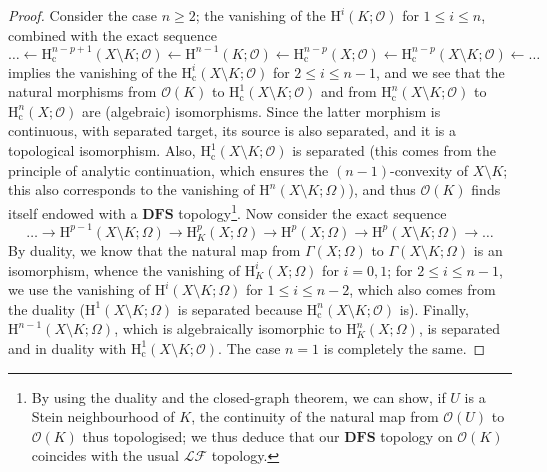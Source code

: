 \documentclass[british]{article}
\begin{document}
\begin{proof}
Consider the case \(n\geqslant2\); the vanishing of the
\(\mathrm{H}^i(K;{\mathscr{O}})\) for \(1\leqslant i\leqslant n\),
combined with the exact sequence \[
  \ldots
  \leftarrow \mathrm{H}_\mathrm{c}^{n-p+1}(X\setminus K;{\mathscr{O}})
  \leftarrow \mathrm{H}^{n-1}(K;{\mathscr{O}})
  \leftarrow \mathrm{H}_\mathrm{c}^{n-p}(X;{\mathscr{O}})
  \leftarrow \mathrm{H}_\mathrm{c}^{n-p}(X\setminus K;{\mathscr{O}})
  \leftarrow \ldots
\] implies the vanishing of the
\(\mathrm{H}_\mathrm{c}^i(X\setminus K;{\mathscr{O}})\) for
\(2\leqslant i\leqslant n-1\), and we see that the natural morphisms
from \({\mathscr{O}}(K)\) to
\(\mathrm{H}_\mathrm{c}^1(X\setminus K;{\mathscr{O}})\) and from
\(\mathrm{H}_\mathrm{c}^n(X\setminus K;{\mathscr{O}})\) to
\(\mathrm{H}_\mathrm{c}^n(X;{\mathscr{O}})\) are (algebraic)
isomorphisms. Since the latter morphism is continuous, with separated
target, its source is also separated, and it is a topological
isomorphism. Also,
\(\mathrm{H}_\mathrm{c}^1(X\setminus K;{\mathscr{O}})\) is separated
(this comes from the principle of analytic continuation, which ensures
the \((n-1)\)-convexity of \(X\setminus K\); this also corresponds to
the vanishing \autocite{9} of \(\mathrm{H}^n(X\setminus K;\Omega)\)),
and thus \({\mathscr{O}}(K)\) finds itself endowed with a
\(\mathbf{DFS}\) topology\footnote{By using the duality and the
  closed-graph theorem, we can show, if \(U\) is a Stein neighbourhood
  of \(K\), the continuity of the natural map from \({\mathscr{O}}(U)\)
  to \({\mathscr{O}}(K)\) thus topologised; we thus deduce that our
  \(\mathbf{DFS}\) topology on \({\mathscr{O}}(K)\) coincides with the
  usual \({\mathscr{LF}}\) topology.}. Now consider the exact sequence
\[
  \ldots
  \to \mathrm{H}^{p-1}(X\setminus K;\Omega)
  \to \mathrm{H}_K^p(X;\Omega)
  \to \mathrm{H}^p(X;\Omega)
  \to \mathrm{H}^p(X\setminus K;\Omega)
  \to \ldots
\] By duality, we know that the natural map from \(\Gamma(X;\Omega)\) to
\(\Gamma(X\setminus K;\Omega)\) is an isomorphism, whence the vanishing
of \(\mathrm{H}_K^i(X;\Omega)\) for \(i=0,1\); for
\(2\leqslant i\leqslant n-1\), we use the vanishing of
\(\mathrm{H}^i(X\setminus K;\Omega)\) for \(1\leqslant i\leqslant n-2\),
which also comes from the duality (\(\mathrm{H}^1(X\setminus K;\Omega)\)
is separated because
\(\mathrm{H}_\mathrm{c}^n(X\setminus K;{\mathscr{O}})\) is). Finally,
\(\mathrm{H}^{n-1}(X\setminus K;\Omega)\), which is algebraically
isomorphic to \(\mathrm{H}_K^n(X;\Omega)\), is separated and in duality
with \(\mathrm{H}_\mathrm{c}^1(X\setminus K;{\mathscr{O}})\). The case
\(n=1\) is completely the same.
\end{proof}
\end{document}
